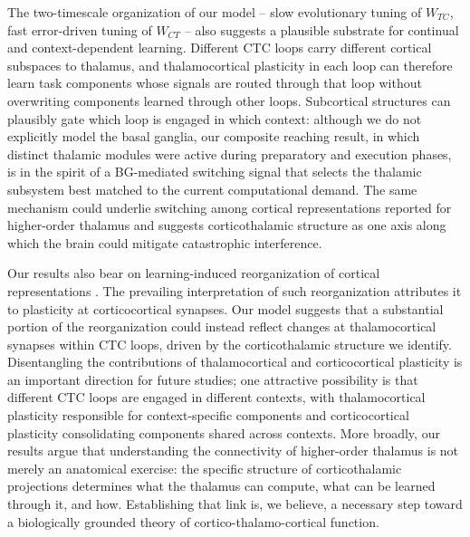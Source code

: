 \documentclass[11pt]{article}
\begin{document}
The two-timescale organization of our model -- slow evolutionary
tuning of $W_{TC}$, fast error-driven tuning of $W_{CT}$ -- also
suggests a plausible substrate for continual and context-dependent
learning. Different CTC loops carry different cortical subspaces to
thalamus, and thalamocortical plasticity in each loop can therefore
learn task components whose signals are routed through that loop
without overwriting components learned through other loops. Subcortical
structures can plausibly gate which loop is engaged in which context:
although we do not explicitly model the basal ganglia, our composite
reaching result, in which distinct thalamic modules were active during
preparatory and execution phases, is in the spirit of a BG-mediated
switching signal that selects the thalamic subsystem best matched to
the current computational demand. The same mechanism could underlie
switching among cortical representations reported for higher-order
thalamus \cite{rikhye2018thalamic, schmitt2017thalamic} and suggests
corticothalamic structure as one axis along which the brain could
mitigate catastrophic interference.

Our results also bear on learning-induced reorganization of cortical
representations \cite{peters2014emergence, mante2013context}. The
prevailing interpretation of such reorganization attributes it to
plasticity at corticocortical synapses. Our model suggests that a
substantial portion of the reorganization could instead reflect
changes at thalamocortical synapses within CTC loops, driven by the
corticothalamic structure we identify. Disentangling the contributions
of thalamocortical and corticocortical plasticity is an important
direction for future studies; one attractive possibility is that
different CTC loops are engaged in different contexts, with
thalamocortical plasticity responsible for context-specific components
and corticocortical plasticity consolidating components shared across
contexts. More broadly, our results argue that understanding the
connectivity of higher-order thalamus is not merely an anatomical
exercise: the specific structure of corticothalamic projections
determines what the thalamus can compute, what can be learned through
it, and how. Establishing that link is, we believe, a necessary step
toward a biologically grounded theory of cortico-thalamo-cortical
function.



\end{document}
